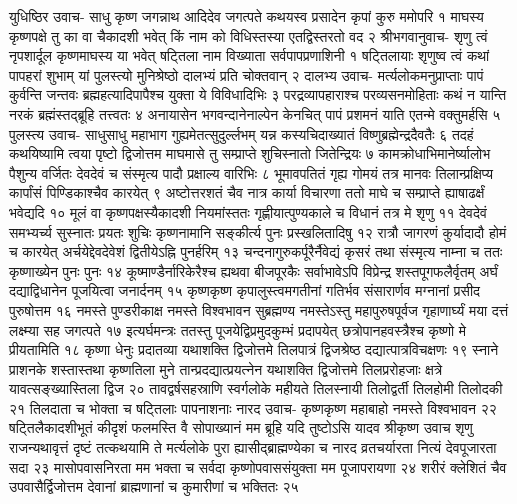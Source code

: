 युधिष्ठिर उवाच-
साधु कृष्ण जगन्नाथ आदिदेव जगत्पते 
कथयस्व प्रसादेन कृपां कुरु ममोपरि १
माघस्य कृष्णपक्षे तु का वा चैकादशी भवेत् 
किं नाम को विधिस्तस्या  एतद्विस्तरतो वद २
श्रीभगवानुवाच-
शृणु त्वं नृपशार्दूल कृष्णमाघस्य या भवेत् 
षट्तिला नाम विख्याता सर्वपापप्रणाशिनी १
षट्तिलायाः शृणुष्व त्वं कथां पापहरां शुभाम् 
यां पुलस्त्यो मुनिश्रेष्ठो दालभ्यं प्रति चोक्तवान् २
दालभ्य उवाच-
मर्त्यलोकमनुप्राप्ताः पापं कुर्वन्ति जन्तवः 
ब्रह्महत्यादिपापैश्च युक्ता ये विविधादिभिः ३
परद्रव्यापहाराश्च परव्यसनमोहिताः 
कथं न यान्ति नरकं ब्रह्मंस्तद्ब्रूहि तत्त्वतः ४
अनायासेन भगवन्दानेनाल्पेन केनचित् 
पापं प्रशमनं याति एतन्मे वक्तुमर्हसि ५
पुलस्त्य उवाच-
साधुसाधु महाभाग गुह्यमेतत्सुदुर्ल्लभम् 
यन्न कस्यचिदाख्यातं विष्णुब्रह्मेन्द्रदैवतैः ६
तदहं कथयिष्यामि त्वया पृष्टो द्विजोत्तम 
माघमासे तु सम्प्राप्ते शुचिस्नातो जितेन्द्रियः ७
कामक्रोधाभिमानेर्ष्यालोभ पैशुन्य वर्जितः 
देवदेवं च संस्मृत्य पादौ प्रक्षाल्य वारिभिः ८
भूमावपतितं गृह्य गोमयं तत्र मानवः 
तिलान्प्रक्षिप्य कार्पांसं पिण्डिकाश्चैव कारयेत् ९
अष्टोत्तरशतं चैव नात्र कार्या विचारणा 
ततो माघे च सम्प्राप्ते ह्याषाढर्क्षं भवेद्यदि १०
मूलं वा कृष्णपक्षस्यैकादशी नियमांस्ततः 
गृह्णीयात्पुण्यकाले च विधानं तत्र मे शृणु ११
देवदेवं समभ्यर्च्य सुस्नातः प्रयतः शुचिः 
कृष्णनामानि सङ्कीर्त्य पुनः प्रस्खलितादिषु १२
रात्रौ जागरणं कुर्यादादौ होमं च कारयेत् 
अर्चयेद्देवदेवेशं द्वितीयेऽह्नि पुनर्हरिम् १३
चन्दनागुरुकर्पूरैर्नैवेद्यं कृसरं तथा 
संस्मृत्य नाम्ना च ततः कृष्णाख्येन पुनः पुनः १४
कूष्माण्डैर्नारिकेरैश्च ह्यथवा बीजपूरकैः 
सर्वाभावेऽपि विप्रेन्द्र शस्तपूगफलैर्वृतम् 
अर्घं दद्याद्विधानेन पूजयित्वा जनार्दनम् १५
कृष्णकृष्ण कृपालुस्त्वमगतीनां गतिर्भव 
संसारार्णव मग्नानां प्रसीद पुरुषोत्तम १६
नमस्ते पुण्डरीकाक्ष नमस्ते विश्वभावन 
सुब्रह्मण्य नमस्तेऽस्तु महापुरुषपूर्वज 
गृहाणार्घ्यं मया दत्तं लक्ष्म्या सह जगत्पते १७
इत्यर्घमन्त्रः 
ततस्तु पूजयेद्विप्रमुदकुम्भं प्रदापयेत् 
छत्रोपानहवस्त्रैश्च कृष्णो मे प्रीयतामिति १८
कृष्णा धेनुः प्रदातव्या यथाशक्ति द्विजोत्तमे 
तिलपात्रं द्विजश्रेष्ठ दद्यात्पात्रविचक्षणः १९
स्नाने प्राशनके शस्तास्तथा कृष्णतिला मुने 
तान्प्रदद्यात्प्रयत्नेन यथाशक्ति द्विजोत्तमे 
तिलप्ररोहजाः क्षत्रे यावत्सङ्ख्यास्तिला द्विज २०
तावद्वर्षसहस्राणि स्वर्गलोके महीयते 
तिलस्नायी तिलोद्वर्ती तिलहोमी तिलोदकी २१
तिलदाता च भोक्ता च षट्तिलाः पापनाशनाः 
नारद उवाच-
कृष्णकृष्ण महाबाहो नमस्ते विश्वभावन २२
षट्तिलैकादशीभूतं कीदृशं फलमस्ति वै 
सोपाख्यानं मम ब्रूहि यदि तुष्टोऽसि यादव 
श्रीकृष्ण उवाच
शृणु राजन्यथावृत्तं दृष्टं तत्कथयामि ते 
मर्त्यलोके पुरा ह्यासीद्ब्राह्मण्येका च नारद 
व्रतचर्यारता नित्यं देवपूजारता सदा २३
मासोपवासनिरता मम भक्ता च सर्वदा 
कृष्णोपवाससंयुक्ता मम पूजापरायणा २४
शरीरं क्लेशितं चैव उपवासैर्द्विजोत्तम 
देवानां ब्राह्मणानां च कुमारीणां च भक्तितः २५
